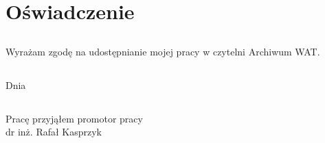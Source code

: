 \chapter*{Oświadczenie}
\section*{}
Wyrażam zgodę na udostępnianie mojej pracy w czytelni Archiwum  WAT.
\section*{}
Dnia \dotfill
\section*{}
\begin{flushright}
	Pracę przyjąłem
	\linebreak
	\linebreak
	\linebreak
	\linebreak
	promotor  pracy\\
	dr inż. Rafał Kasprzyk
\end{flushright}
